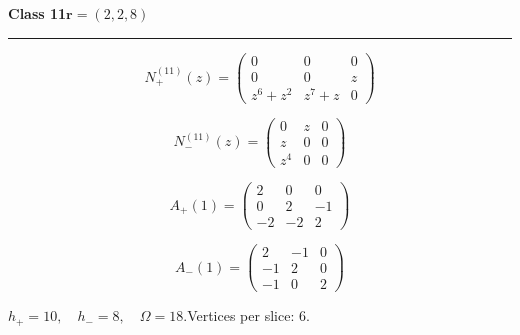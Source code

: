 \noindent\begin{minipage}{\linewidth}
\noindent\textbf{Class 11}\hfill $\symbf{r}=(2,2,8)$
\par\smallskip\noindent\textcolor{rulegray}{\rule{\linewidth}{0.3pt}}
\begin{minipage}[c]{0.495\linewidth}\centering\fontsize{10.5}{13}\selectfont
\setlength{\abovedisplayskip}{3pt}\setlength{\belowdisplayskip}{3pt}
\setlength{\abovedisplayshortskip}{3pt}\setlength{\belowdisplayshortskip}{3pt}
\setlength{\arraycolsep}{3.5pt}\renewcommand{\arraystretch}{1.18}
\[N_{+}^{(11)}(z)=\begin{pmatrix}0 & 0 & 0\\0 & 0 & z\\z^{6} + z^{2} & z^{7} + z & 0\end{pmatrix}\]
\end{minipage}%
\begin{minipage}[c]{0.495\linewidth}\centering\fontsize{10.5}{13}\selectfont
\setlength{\abovedisplayskip}{3pt}\setlength{\belowdisplayskip}{3pt}
\setlength{\abovedisplayshortskip}{3pt}\setlength{\belowdisplayshortskip}{3pt}
\setlength{\arraycolsep}{3.5pt}\renewcommand{\arraystretch}{1.18}
\[N_{-}^{(11)}(z)=\begin{pmatrix}0 & z & 0\\z & 0 & 0\\z^{4} & 0 & 0\end{pmatrix}\]
\end{minipage}%
\par\noindent
\begin{minipage}[c]{0.495\linewidth}\centering\fontsize{10.5}{13}\selectfont
\setlength{\abovedisplayskip}{3pt}\setlength{\belowdisplayskip}{3pt}
\setlength{\abovedisplayshortskip}{3pt}\setlength{\belowdisplayshortskip}{3pt}
\setlength{\arraycolsep}{3.5pt}\renewcommand{\arraystretch}{1.18}
\[A_{+}(1)=\begin{pmatrix}2 & 0 & 0\\0 & 2 & -1\\-2 & -2 & 2\end{pmatrix}\]
\end{minipage}%
\begin{minipage}[c]{0.495\linewidth}\centering\fontsize{10.5}{13}\selectfont
\setlength{\abovedisplayskip}{3pt}\setlength{\belowdisplayskip}{3pt}
\setlength{\abovedisplayshortskip}{3pt}\setlength{\belowdisplayshortskip}{3pt}
\setlength{\arraycolsep}{3.5pt}\renewcommand{\arraystretch}{1.18}
\[A_{-}(1)=\begin{pmatrix}2 & -1 & 0\\-1 & 2 & 0\\-1 & 0 & 2\end{pmatrix}\]
\end{minipage}%
\par\smallskip\noindent\small $h_+=10,\quad h_-=8,\quad \Omega=18.$\quad Vertices per slice: 6.
\end{minipage}\par\vfill

